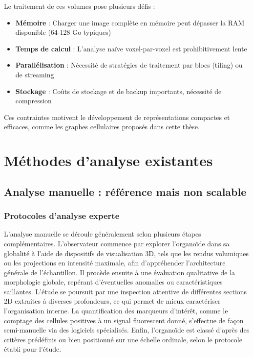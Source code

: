 Le traitement de ces volumes pose plusieurs défis :
\begin{itemize}
    \item \textbf{Mémoire} : Charger une image complète en mémoire peut dépasser la RAM disponible (64-128 Go typiques)
    \item \textbf{Temps de calcul} : L'analyse naïve voxel-par-voxel est prohibitivement lente
    \item \textbf{Parallélisation} : Nécessité de stratégies de traitement par blocs (tiling) ou de streaming
    \item \textbf{Stockage} : Coûts de stockage et de backup importants, nécessité de compression
\end{itemize}

Ces contraintes motivent le développement de représentations compactes et efficaces, comme les graphes cellulaires proposés dans cette thèse.

\section{Méthodes d'analyse existantes}

\subsection{Analyse manuelle : référence mais non scalable}

\subsubsection{Protocoles d'analyse experte}

L'analyse manuelle se déroule généralement selon plusieurs étapes complémentaires. L'observateur commence par explorer l'organoïde dans sa globalité à l'aide de dispositifs de visualisation 3D, tels que les rendus volumiques ou les projections en intensité maximale, afin d'appréhender l'architecture générale de l'échantillon. Il procède ensuite à une évaluation qualitative de la morphologie globale, repérant d'éventuelles anomalies ou caractéristiques saillantes. L'étude se poursuit par une inspection attentive de différentes sections 2D extraites à diverses profondeurs, ce qui permet de mieux caractériser l'organisation interne. La quantification des marqueurs d'intérêt, comme le comptage des cellules positives à un signal fluorescent donné, s'effectue de façon semi-manuelle via des logiciels spécialisés. Enfin, l'organoïde est classé d'après des critères prédéfinis ou bien positionné sur une échelle ordinale, selon le protocole établi pour l'étude.

